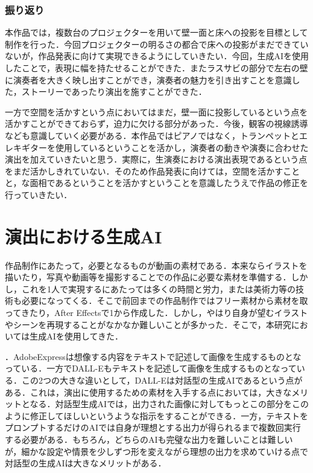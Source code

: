 \subsubsection{振り返り}
本作品では，複数台のプロジェクターを用いて壁一面と床への投影を目標として制作を行った．今回プロジェクターの明るさの都合で床への投影がまだできていないが，作品発表に向けて実現できるようにしていきたい．今回，生成AIを使用したことで，表現に幅を持たせることができた．またラスサビの部分で左右の壁に演奏者を大きく映し出すことができ，演奏者の魅力を引き出すことを意識した，ストーリーであったり演出を施すことができた．

一方で空間を活かすという点においてはまだ，壁一面に投影しているという点を活かすことができておらず，迫力に欠ける部分があった．今後，観客の視線誘導なども意識していく必要がある．本作品ではピアノではなく，トランペットとエレキギターを使用しているということを活かし，演奏者の動きや演奏に合わせた演出を加えていきたいと思う．実際に，生演奏における演出表現であるという点をまだ活かしきれていない．そのため作品発表に向けては，空間を活かすことと，な面相であるということを活かすということを意識したうえで作品の修正を行っていきたい．

\section{演出における生成AI}

作品制作にあたって，必要となるものが動画の素材である．本来ならイラストを描いたり，写真や動画等を撮影することでの作品に必要な素材を準備する．しかし，これを1人で実現するにあたっては多くの時間と労力，または美術力等の技術も必要になってくる．そこで前回までの作品制作ではフリー素材から素材を取ってきたり，After Effectsで1から作成した．しかし，やはり自身が望むイラストやシーンを再現することがなかなか難しいことが多かった．そこで，本研究においては生成AIを使用してきた．

．AdobeExpressは想像する内容をテキストで記述して画像を生成するものとなっている．一方でDALL-Eもテキストを記述して画像を生成するものとなっている．この2つの大きな違いとして，DALL-Eは対話型の生成AIであるという点がある．これは，演出に使用するための素材を入手する点においては，大きなメリットとなる．対話型生成AIでは，出力された画像に対してもっとこの部分をこのように修正してほしいというような指示をすることができる．一方，テキストをプロンプトするだけのAIでは自身が理想とする出力が得られるまで複数回実行する必要がある．もちろん，どちらのAIも完璧な出力を難しいことは難しいが，細かな設定や情景を少しずつ形を変えながら理想の出力を求めていける点で対話型の生成AIは大きなメリットがある．

